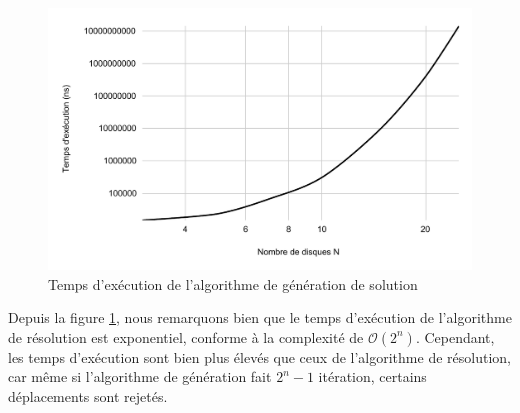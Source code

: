 \begin{figure}[H]
    \centering
        \includegraphics[scale=0.6]{./ressources/temps_execution_algo_generation.pdf}
        \caption{Temps d'exécution de l'algorithme de génération de solution}
    \label{fig:temps_exec_algo_generation}
\end{figure}
\par
Depuis la figure \ref{fig:temps_exec_algo_generation}, nous remarquons bien que le temps d'exécution de l'algorithme de résolution est exponentiel, conforme à la complexité de $\mathcal{O}(2^{n})$. Cependant, les temps d'exécution sont bien plus élevés que ceux de l'algorithme de résolution, car même si l'algorithme de génération fait $2^{n} - 1$ itération, certains déplacements sont rejetés.


